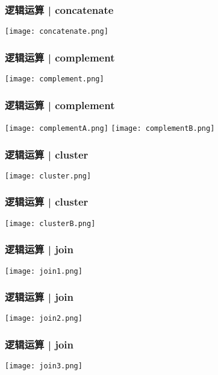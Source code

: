 \begin{frame}
  \frametitle{逻辑运算 | concatenate}
    \begin{center}
      \texttt{[image: concatenate.png]}
    \end{center}
\end{frame}

\begin{frame}
  \frametitle{逻辑运算 | complement}
    \begin{center}
      \texttt{[image: complement.png]}
    \end{center}
\end{frame}

\begin{frame}
  \frametitle{逻辑运算 | complement}
    \begin{center}
      \texttt{[image: complementA.png]}
      \vspace{0.5cm}
      \texttt{[image: complementB.png]}
    \end{center}
\end{frame}

\begin{frame}
  \frametitle{逻辑运算 | cluster}
    \begin{center}
      \texttt{[image: cluster.png]}
    \end{center}
\end{frame}

\begin{frame}
  \frametitle{逻辑运算 | cluster}
    \begin{center}
      \texttt{[image: clusterB.png]}
    \end{center}
\end{frame}

\begin{frame}
  \frametitle{逻辑运算 | join}
    \begin{center}
      \texttt{[image: join1.png]}
    \end{center}
\end{frame}

\begin{frame}
  \frametitle{逻辑运算 | join}
    \begin{center}
      \texttt{[image: join2.png]}
    \end{center}
\end{frame}

\begin{frame}
  \frametitle{逻辑运算 | join}
    \begin{center}
      \texttt{[image: join3.png]}
    \end{center}
\end{frame}

